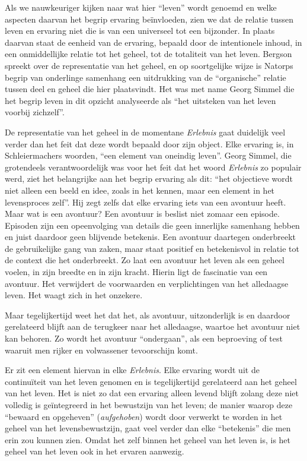 Als we nauwkeuriger kijken naar wat hier ``leven'' wordt genoemd en welke aspecten daarvan het begrip ervaring beïnvloeden, zien we dat de relatie tussen leven en ervaring niet die is van een universeel tot een bijzonder. In plaats daarvan staat de eenheid van de ervaring, bepaald door de intentionele inhoud, in een onmiddellijke relatie tot het geheel, tot de totaliteit van het leven. Bergson spreekt over de representatie van het geheel, en op soortgelijke wijze is Natorps begrip van onderlinge samenhang een uitdrukking van de ``organische'' relatie tussen deel en geheel die hier plaatsvindt. Het was met name Georg Simmel die het begrip leven in dit opzicht analyseerde als ``het uitsteken van het leven voorbij zichzelf''.

De representatie van het geheel in de momentane \textit{Erlebnis} gaat duidelijk veel verder dan het feit dat deze wordt bepaald door zijn object. Elke ervaring is, in Schleiermachers woorden, ``een element van oneindig leven''. Georg Simmel, die grotendeels verantwoordelijk was voor het feit dat het woord \textit{Erlebnis} zo populair werd, ziet het belangrijke aan het begrip ervaring als dit: ``het objectieve wordt niet alleen een beeld en idee, zoals in het kennen, maar een element in het levensproces zelf''. Hij zegt zelfs dat elke ervaring iets van een avontuur heeft. Maar wat is een avontuur? Een avontuur is beslist niet zomaar een episode. Episoden zijn een opeenvolging van details die geen innerlijke samenhang hebben en juist daardoor geen blijvende betekenis. Een avontuur daartegen onderbreekt de gebruikelijke gang van zaken, maar staat positief en betekenisvol in relatie tot de context die het onderbreekt. Zo laat een avontuur het leven als een geheel voelen, in zijn breedte en in zijn kracht. Hierin ligt de fascinatie van een avontuur. Het verwijdert de voorwaarden en verplichtingen van het alledaagse leven. Het waagt zich in het onzekere.

Maar tegelijkertijd weet het dat het, als avontuur, uitzonderlijk is en daardoor gerelateerd blijft aan de terugkeer naar het alledaagse, waartoe het avontuur niet kan behoren. Zo wordt het avontuur ``ondergaan'', als een beproeving of test waaruit men rijker en volwassener tevoorschijn komt.

Er zit een element hiervan in elke \textit{Erlebnis}. Elke ervaring wordt uit de continuïteit van het leven genomen en is tegelijkertijd gerelateerd aan het geheel van het leven. Het is niet zo dat een ervaring alleen levend blijft zolang deze niet volledig is geïntegreerd in het bewustzijn van het leven; de manier waarop deze ``bewaard en opgeheven'' (\textit{aufgehoben}) wordt door verwerkt te worden in het geheel van het levensbewustzijn, gaat veel verder dan elke ``betekenis'' die men erin zou kunnen zien. Omdat het zelf binnen het geheel van het leven is, is het geheel van het leven ook in het ervaren aanwezig.

